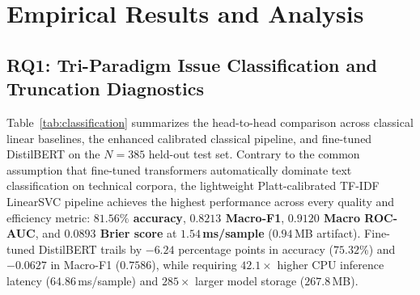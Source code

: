 \documentclass[conference]{IEEEtran}
\begin{document}
\section{Empirical Results and Analysis}
\label{sec:results}

\subsection{RQ1: Tri-Paradigm Issue Classification and Truncation Diagnostics}
\label{sec:results_cls}

Table~\ref{tab:classification} summarizes the head-to-head comparison across classical linear baselines, the enhanced calibrated classical pipeline, and fine-tuned DistilBERT on the $N=385$ held-out test set. Contrary to the common assumption that fine-tuned transformers automatically dominate text classification on technical corpora, the lightweight Platt-calibrated TF-IDF LinearSVC pipeline achieves the highest performance across every quality and efficiency metric: \textbf{$81.56\%$ accuracy}, \textbf{$0.8213$ Macro-F1}, \textbf{$0.9120$ Macro ROC-AUC}, and \textbf{$0.0893$ Brier score} at \textbf{$1.54$\,ms/sample} ($0.94$\,MB artifact). Fine-tuned DistilBERT trails by $-6.24$ percentage points in accuracy ($75.32\%$) and $-0.0627$ in Macro-F1 ($0.7586$), while requiring $42.1\times$ higher CPU inference latency ($64.86$\,ms/sample) and $285\times$ larger model storage ($267.8$\,MB).

\begin{table}[t]
\centering
\caption{In-Distribution Tri-Paradigm Issue Classification Benchmark ($N=385$ Holdout, 3 Canonical Classes, CPU Inference)}
\label{tab:classification}
\setlength{\tabcolsep}{3.2pt}
\end{table}
\end{document}
